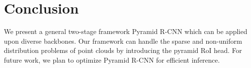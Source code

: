 \documentclass[10pt,twocolumn,letterpaper]{article}
\begin{document}
\begin{table}[]
\setlength{\belowcaptionskip}{10pt}
\caption{Effects of different RoI pyramids in Pyramid-PV on the Waymo dataset. Each element in [$\cdot$] stands for the respective parameter of a pyramid level.} \label{table_ablation_2}
\vspace{-2mm}
\end{table}

\begin{table}[]
\setlength{\belowcaptionskip}{10pt}
\caption{Comparisons on the inference speeds of different detection models on the KITTI dataset.} \label{table_ablation_3}
\vspace{-2mm}
\end{table}

\vspace{-1mm}
\section{Conclusion}
\vspace{-1mm}
We present a general two-stage framework Pyramid R-CNN which can be applied upon diverse backbones. Our framework can handle the sparse and non-uniform distribution problems of point clouds by introducing the pyramid RoI head. For future work, we plan to optimize Pyramid R-CNN for efficient inference.
\end{document}
